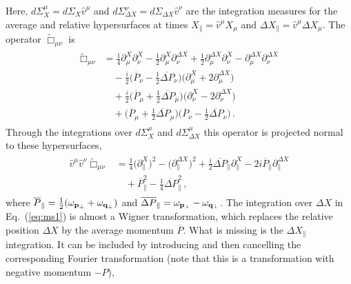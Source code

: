 \documentclass[reprint,superscriptaddress,english,preprintnumbers,amsmath,amssymb,aps,prx]{revtex4-2}
\def\Eq#1{Eq.~(\ref{#1})}
\begin{document}
Here, $d\Sigma_X^\mu = d\Sigma_X \hat v^\mu$ and $d\Sigma_{\Delta X}^\nu= d\Sigma_{\Delta X} \hat v^\nu$ are the integration measures for the average and relative hypersurfaces at times $X_\parallel = \hat v^\mu X_\mu$ and $\Delta X_\parallel = \hat v^\mu \Delta X_\mu$. The operator $\widetilde\Box_{\mu\nu}$ is
\begin{align}
\begin{split}
\widetilde\Box_{\mu\nu} &= \frac{1}{4} \partial_{\mu}^X\partial_{\nu}^X - \frac{1}{2}\partial_{\mu}^X\partial_{\nu}^{\Delta X} + \frac{1}{2} \partial_{\mu}^{\Delta X}\partial_{\nu}^X - \partial_{\mu}^{\Delta X}\partial_{\nu}^{\Delta X}\\
&\quad -\frac{i}{2}\bigg( \overline{P}_\nu - \frac{1}{2} \overline{\Delta P}_\nu \bigg)\big(\partial_{\mu}^X+2\partial_{\mu}^{\Delta X}\big)\\
&\quad+\frac{i}{2}\bigg( \overline{P}_\mu + \frac{1}{2} \overline{\Delta P}_\mu \bigg)\big(\partial_{\nu}^X-2\partial_{\nu}^{\Delta X}\big)\\
&\quad + \bigg( \overline{P}_\mu + \frac{1}{2}\overline{\Delta P}_\mu \bigg) \bigg( \overline{P}_\nu - \frac{1}{2}\overline{\Delta P}_\nu \bigg)\,.
\end{split}
\end{align}
Through the integrations over $d\Sigma_X^\mu$ and $d\Sigma_{\Delta X}^\mu$ this operator is projected normal to these hypersurfaces,
\begin{align}\label{eq:vvbox}
\begin{split}
\hat v^\mu \hat v^\nu \widetilde\Box_{\mu\nu} &= \frac{1}{4}\big(\partial_{\parallel}^X\big)^2 -\big(\partial_{\parallel}^{\Delta X}\big)^2 + \frac{i}{2}\overline{\Delta P}_\parallel \partial_{\parallel}^X - 2 i \overline{P}_\parallel \partial_{\parallel}^{\Delta X}\\
&\quad + \overline{P}_\parallel^2 - \frac{1}{4} \overline{\Delta P}_\parallel^2\,,
\end{split}
\end{align}
where $\overline{P}_\parallel = \frac{1}{2}(\omega_{\bold{p}_\perp}+\omega_{\bold{q}_\perp})$ and $\overline{\Delta P}_\parallel = \omega_{\bold{p}_\perp}-\omega_{\bold{q}_\perp}$.
The integration over $\Delta X$ in \Eq{eq:ms1} is almost a Wigner transformation, which replaces the relative position $\Delta X$ 
by the average momentum $\overline{P}$. What is missing is the $\Delta X_\parallel$ integration. It can be included by introducing and then cancelling the corresponding Fourier transformation (note that this is a transformation with negative momentum $-P$),
\end{document}
